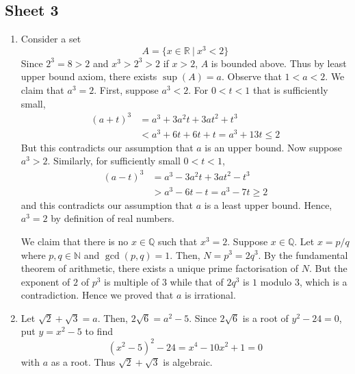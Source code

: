 \documentclass[10pt, a4paper, twoside]{report}
\begin{document}
\subsection{Sheet 3}
\begin{enumerate}[{1.}]
    \item Consider a set 
    \[A=\{x\in\mathbb{R}\:|\:x^3<2\}\]
    Since \(2^3=8>2\) and \(x^3>2^3>2\) if \(x>2\), \(A\) is bounded above. Thus by least upper bound axiom, there exists \(\sup(A)=a\). Observe that \(1<a<2\). We claim that \(a^3=2\). First, suppose \(a^3<2\). For \(0<t<1\) that is sufficiently small,
    \begin{align*}
        (a+t)^3&=a^3+3a^2t+3at^2+t^3 \\
        &<a^3+6t+6t+t=a^3+13t\leq 2
    \end{align*}
    But this contradicts our assumption that \(a\) is an upper bound. Now suppose \(a^3>2\). Similarly, for sufficiently small \(0<t<1\), 
    \begin{align*}
        (a-t)^3&=a^3-3a^2t+3at^2-t^3 \\
        &>a^3-6t-t=a^3-7t\geq 2
    \end{align*}
    and this contradicts our assumption that \(a\) is a least upper bound. Hence, \(a^3=2\) by definition of real numbers.

    We claim that there is no \(x\in\mathbb{Q}\) such that \(x^3=2\). Suppose \(x\in\mathbb{Q}\). Let \(x=p/q\) where \(p,q\in\mathbb{N}\) and \(\gcd(p,q)=1\). Then, \(N=p^3=2q^3\). By the fundamental theorem of arithmetic, there exists a unique prime factorisation of \(N\). But the exponent of \(2\) of \(p^3\) is multiple of \(3\) while that of \(2q^3\) is \(1\) modulo \(3\), which is a contradiction. Hence we proved that \(a\) is irrational.
    \item Let \(\sqrt{2}+\sqrt{3}=a\). Then, \(2\sqrt{6}=a^2-5\). Since \(2\sqrt{6}\) is a root of \(y^2-24=0\), put \(y=x^2-5\) to find 
    \[(x^2-5)^2-24=x^4-10x^2+1=0\]
    with \(a\) as a root. Thus \(\sqrt{2}+\sqrt{3}\) is algebraic.


\end{enumerate}
\end{document}
